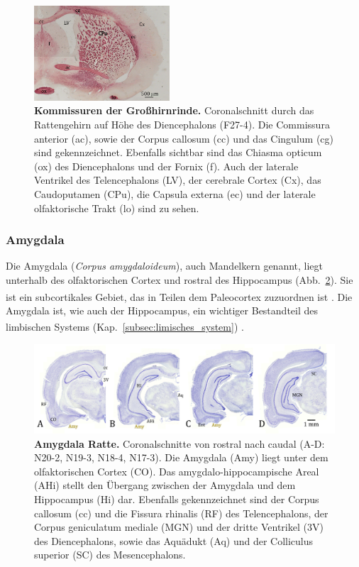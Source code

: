 \documentclass[12pt,a4paper,pdftex]{article}
\begin{document}
\begin{figure}[H]
    \centering
    \includegraphics[width=0.45\textwidth]{pictures/Bilder_Jule/Ratte/faser_cortex.png}
    \caption[Kommissuren der Großhirnrinde]{\textbf{Kommissuren der Großhirnrinde.} Coronalschnitt durch das Rattengehirn auf Höhe des Diencephalons (F27-4). Die Commissura anterior (ac), sowie der Corpus callosum (cc) und das Cingulum (cg) sind gekennzeichnet. Ebenfalls sichtbar sind das Chiasma opticum (ox) des Diencephalons und der Fornix (f). Auch der laterale Ventrikel des Telencephalons (LV), der cerebrale Cortex (Cx), das Caudoputamen (CPu), die Capsula externa (ec) und der laterale olfaktorische Trakt (lo) sind zu sehen.}
    \label{fig:faser_cortico-cortical}
\end{figure}

\subsubsection{Amygdala}
\label{subsubsec:Amygdala} 

Die Amygdala (\textit{Corpus amygdaloideum}), auch Mandelkern genannt, liegt unterhalb des olfaktorischen Cortex und rostral des Hippocampus (Abb.~\ref{fig:amygdala_ratte}). Sie ist ein subcortikales Gebiet, das in Teilen dem Paleocortex zuzuordnen ist \textsuperscript{\cite[9]{trepel2011neuroanatomie}}. Die Amygdala ist, wie auch der Hippocampus, ein wichtiger Bestandteil des limbischen Systems (Kap.~\ref{subsec:limisches_system}) \textsuperscript{\cite[15]{kandel2013principles}}.

\begin{figure}[H]
    \centering
    \includegraphics[width=\textwidth]{pictures/Bilder_Jule/Ratte/amygdala.png}
    \caption[Amygdala Ratte]{\textbf{Amygdala Ratte.} Coronalschnitte von rostral nach caudal (A-D: N20-2, N19-3, N18-4, N17-3). Die Amygdala (Amy) liegt unter dem olfaktorischen Cortex (CO). Das amygdalo-hippocampische Areal (AHi) stellt den Übergang zwischen der Amygdala und dem Hippocampus (Hi) dar. Ebenfalls gekennzeichnet sind der Corpus callosum (cc) und die Fissura rhinalis (RF) des Telencephalons, der Corpus geniculatum mediale (MGN) und der dritte Ventrikel (3V) des Diencephalons, sowie das Aquädukt (Aq) und der Colliculus superior (SC) des Mesencephalons.}
    \label{fig:amygdala_ratte}
\end{figure}{}
\end{document}
